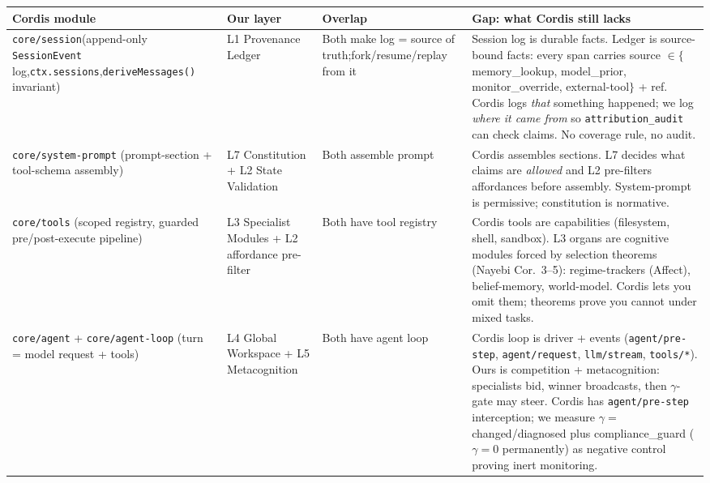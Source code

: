 \documentclass[11pt]{article}
\providecommand{\slash}{}\renewcommand{\slash}{/\allowbreak{}}
\begin{document}
\begin{table}[h]
\centering
\small
\begin{tabular}{P{2.6cm}P{2.4cm}P{2.4cm}P{4.2cm}}
\toprule
Cordis module & Our layer & Overlap & Gap: what Cordis still lacks \\
\midrule
\texttt{core/\allowbreak{}session}\linebreak[1] (append-only \texttt{Session\allowbreak{}Event} log,\linebreak[1] \texttt{ctx.\allowbreak{}sessions},\linebreak[1] \texttt{derive\allowbreak{}Messages()} invariant) &
L1 Provenance Ledger &
Both make log = source of truth;\linebreak[1] fork\slash{}resume\slash{}replay from it &
Session log is durable facts. Ledger is source-bound facts: every span carries source $\in\{$memory\_lookup, model\_prior, monitor\_override, external-tool$\}$ + ref. Cordis logs \emph{that} something happened; we log \emph{where it came from} so \texttt{attribution\_audit} can check claims. No coverage rule, no audit. \\[6pt]
\texttt{core/\allowbreak{}system-\allowbreak{}prompt} (prompt-section + tool-schema assembly) &
L7 Constitution + L2 State Validation &
Both assemble prompt &
Cordis assembles sections. L7 decides what claims are \emph{allowed} and L2 pre-filters affordances before assembly. System-prompt is permissive; constitution is normative. \\[6pt]
\texttt{core/tools} (scoped registry, guarded pre/post-execute pipeline) &
L3 Specialist Modules + L2 affordance pre-filter &
Both have tool registry &
Cordis tools are capabilities (filesystem, shell, sandbox). L3 organs are cognitive modules forced by selection theorems (Nayebi Cor.~3--5): regime-trackers (Affect), belief-memory, world-model. Cordis lets you omit them; theorems prove you cannot under mixed tasks. \\[6pt]
\texttt{core/agent} + \texttt{core/\allowbreak{}agent-\allowbreak{}loop} (turn = model request + tools) &
L4 Global Workspace + L5 Metacognition &
Both have agent loop &
Cordis loop is driver + events (\texttt{agent/\allowbreak{}pre-\allowbreak{}step}, \texttt{agent/\allowbreak{}request}, \texttt{llm/stream}, \texttt{tools/*}). Ours is competition + metacognition: specialists bid, winner broadcasts, then $\gamma$-gate may steer. Cordis has \texttt{agent/\allowbreak{}pre-\allowbreak{}step} interception; we measure $\gamma=$ changed/diagnosed plus compliance\_guard ($\gamma=0$ permanently) as negative control proving inert monitoring. \\[6pt]

\end{tabular}
\end{table}
\end{document}
